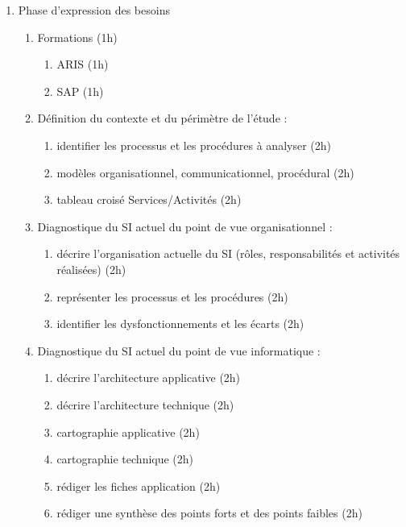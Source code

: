 \begin{enumerate}
    \item Phase d'expression des besoins
          \begin{enumerate}
            \item Formations (1h)
                \begin{enumerate}
                  \item ARIS (1h)
                  \item SAP (1h)
                \end{enumerate}
            \item Définition du contexte et du périmètre de l'étude :
                \begin{enumerate}
                  \item identifier les processus et les procédures à analyser (2h)
                  \item modèles organisationnel, communicationnel, procédural (2h)
                  \item tableau croisé Services/Activités (2h) 
                \end{enumerate}
            \item Diagnostique du SI actuel du point de vue organisationnel : 
                \begin{enumerate}
                  \item décrire l'organisation actuelle du SI (rôles, responsabilités et activités réalisées) (2h)
                  \item représenter les processus et les procédures (2h)
                  \item identifier les dysfonctionnements et les écarts (2h)
                \end{enumerate}
            \item Diagnostique du SI actuel du point de vue informatique : 
                \begin{enumerate}
                  \item décrire l'architecture applicative (2h)
                  \item décrire l'architecture technique (2h)
                  \item cartographie applicative (2h)
                  \item cartographie technique (2h)
                  \item rédiger les fiches application (2h)
                  \item rédiger une synthèse des points forts et des points faibles (2h)
                \end{enumerate}

\end{enumerate}
\end{enumerate}
